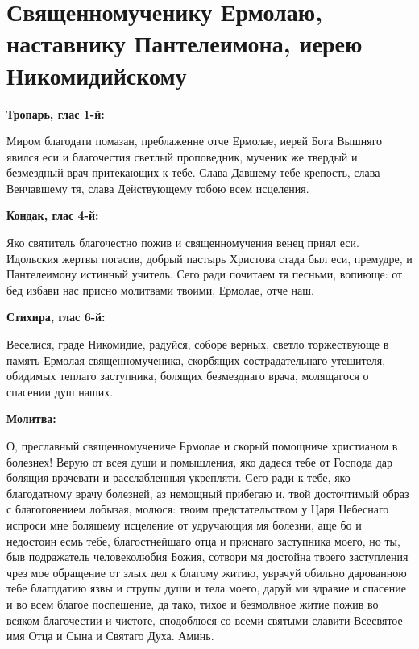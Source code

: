 
 

\section{Священномученику Ермолаю, наставнику Пантелеимона, иерею Никомидийскому}
 


\bfseries Тропарь, глас 1-й:\normalfont{}\nopagebreak


Миром благодати помазан, преблаженне отче Ермолае, иерей Бога Вышняго явился еси и благочестия светлый проповедник, мученик же твердый и безмездный врач притекающих к тебе. Слава Давшему тебе крепость, слава Венчавшему тя, слава Действующему тобою всем исцеления.


\medskip


\bfseries Кондак, глас 4-й:\normalfont{}\nopagebreak


Яко святитель благочестно пожив и священномучения венец приял еси. Идольския жертвы погасив, добрый пастырь Христова стада был еси, премудре, и Пантелеимону истинный учитель. Сего ради почитаем тя песньми, вопиюще: от бед избави нас присно молитвами твоими, Ермолае, отче наш.


\medskip


\bfseries Стихира, глас 6-й:\normalfont{}\nopagebreak


Веселися, граде Никомидие, радуйся, соборе верных, светло торжествующе в память Ермолая священномученика, скорбящих сострадательнаго утешителя, обидимых теплаго заступника, болящих безмезднаго врача, молящагося о спасении душ наших.


\medskip


\bfseries Молитва:\normalfont{}\nopagebreak


О, преславный священномучениче Ермолае и скорый помощниче христианом в болезнех! Верую от всея души и помышления, яко дадеся тебе от Господа дар болящия врачевати и расслабленныя укрепляти. Сего ради к тебе, яко благодатному врачу болезней, аз немощный прибегаю и, твой досточтимый образ с благоговением лобызая, молюся: твоим предстательством у Царя Небеснаго испроси мне болящему исцеление от удручающия мя болезни, аще бо и недостоин есмь тебе, благостнейшаго отца и приснаго заступника моего, но ты, быв подражатель человеколюбия Божия, сотвори мя достойна твоего заступления чрез мое обращение от злых дел к благому житию, уврачуй обильно дарованною тебе благодатию язвы и струпы души и тела моего, даруй ми здравие и спасение и во всем благое поспешение, да тако, тихое и безмолвное житие пожив во всяком благочестии и чистоте, сподоблюся со всеми святыми славити Всесвятое имя Отца и Сына и Святаго Духа. Аминь.


